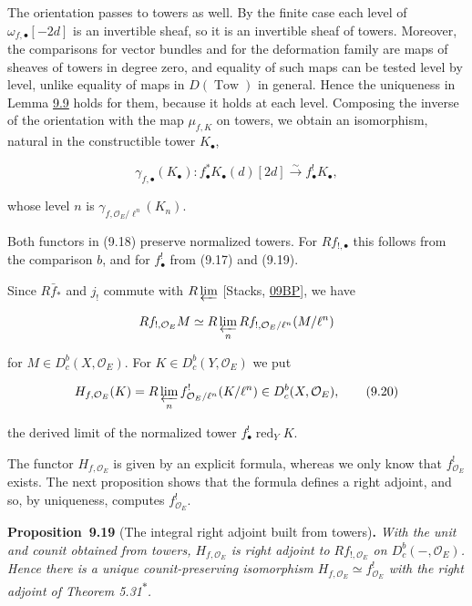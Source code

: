 \documentclass[11pt]{article}
\newenvironment{bpstatement}[2]{\par\addvspace{0.6\baselineskip}\noindent\textbf{#1}#2\textbf{.}\enspace\ignorespaces}
  {\par\addvspace{0.4\baselineskip}}
\newenvironment{bpstatementit}[2]{\begin{bpstatement}{#1}{#2}\itshape\ignorespaces}{\end{bpstatement}}
\newcommand{\bpout}[1]{#1\textsuperscript{\hyperlink{bp-outside}{\ensuremath{\ast}}}}
\providecommand{\Dbc}{}\renewcommand{\Dbc}{D^b_c}
\begin{document}
\label{bp62}%
The orientation passes to towers as well. By the finite case each level of \(\omega_{f,\bullet}[-2d]\) is an invertible sheaf, so it is an invertible sheaf of towers. Moreover, the comparisons for vector bundles and for the deformation family are maps of sheaves of towers in degree zero, and equality of such maps can be tested level by level, unlike equality of maps in \(D(\operatorname{Tow})\) in general. Hence the uniqueness in Lemma \hyperref[bp29]{9.9} holds for them, because it holds at each level. Composing the inverse of the orientation with the map \(\mu_{f,K}\) on towers, we obtain an isomorphism, natural in the constructible tower \(K_\bullet\),

\[
\gamma_{f,\bullet}(K_\bullet):f_\bullet^*K_\bullet(d)[2d]\xrightarrow{\sim}f_\bullet^!K_\bullet,
\tag{9.19}
\]

whose level \(n\) is \(\gamma_{f,\mathcal O_E/\ell^n}(K_n)\).

Both functors in (9.18) preserve normalized towers. For \(Rf_{!,\bullet}\) this follows from the comparison \(b\), and for \(f_\bullet^!\) from (9.17) and (9.19).

Since \(R\bar f_*\) and \(j_!\) commute with \(R\varprojlim\) [Stacks, \href{https://stacks.math.columbia.edu/tag/09BP}{09BP}], we have

\[
Rf_{!,\mathcal O_E}M\simeq R\varprojlim_nRf_{!,\mathcal O_E/\ell^n}(M/\ell^n)
\]

for \(M\in\Dbc(X,\mathcal O_E)\). For \(K\in\Dbc(Y,\mathcal O_E)\) we put

\[
H_{f,\mathcal O_E}(K)=R\varprojlim_n f_{\mathcal O_E/\ell^n}^!(K/\ell^n)\in\Dbc(X,\mathcal O_E),
\tag{9.20}
\]

the derived limit of the normalized tower \(f_\bullet^!\operatorname{red}_YK\).

The functor \(H_{f,\mathcal O_E}\) is given by an explicit formula, whereas we only know that \(f^!_{\mathcal O_E}\) exists. The next proposition shows that the formula defines a right adjoint, and so, by uniqueness, computes \(f^!_{\mathcal O_E}\).

\label{bp63}%
\begin{bpstatementit}{Proposition~9.19}{ (The integral right adjoint built from towers)}
With the unit and counit obtained from towers, \(H_{f,\mathcal O_E}\) is right adjoint to \(Rf_{!,\mathcal O_E}\) on \(\Dbc(-,\mathcal O_E)\). Hence there is a unique counit-preserving isomorphism \(H_{f,\mathcal O_E}\simeq f^!_{\mathcal O_E}\) with the right adjoint of Theorem \bpout{5.31}.
\end{bpstatementit}
\end{document}
